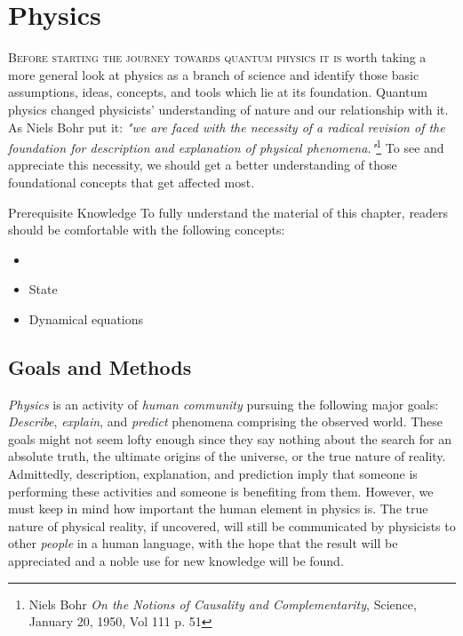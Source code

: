 \graphicspath{{../02Physics/pics/}}
	
\chapter[Physics]{Physics}\label{ch:Physics}

\lettrine[lines=2]{\color{darkocre}B}{efore starting the journey towards quantum physics it is} worth  taking a more general look at physics as a branch of science and identify those basic assumptions, ideas, concepts, and tools which lie at its foundation. Quantum physics changed physicists' understanding of nature and our relationship with it. As Niels Bohr put it: {\it "we are faced with the necessity of a radical revision of the foundation for description
and explanation of physical phenomena."}\footnote{Niels Bohr {\it On the Notions of Causality and Complementarity}, Science, January 20, 1950, Vol 111 p. 51} To see and appreciate this necessity,  we should get a better understanding of those foundational concepts that get affected most.

\begin{myprereq}{Prerequisite Knowledge}
	To fully understand the material of this chapter, readers should be comfortable with the following concepts:
	
	\begin{itemize}
		\item \phantom{phantom}
		\vspace{-0.5cm}
		\item State
		\item Dynamical equations
	\end{itemize}	
\end{myprereq}

\section{Goals and Methods}
\emph{Physics} is an activity of \emph{human community} pursuing the following major goals: \emph{Describe}, \emph{explain}, and \emph{predict} phenomena comprising the observed world. These goals might not seem lofty enough since they say nothing about the search for an absolute truth, the ultimate origins of the universe, or the true nature of reality. Admittedly, description, explanation, and prediction imply that someone is performing these activities and someone is benefiting from them. However, we must keep in mind how important the human element in physics is. The true nature of physical reality, if uncovered, will still be communicated by physicists to other \emph{people} in a human language, with the hope that the result will be appreciated and a noble use for new knowledge will be found.


